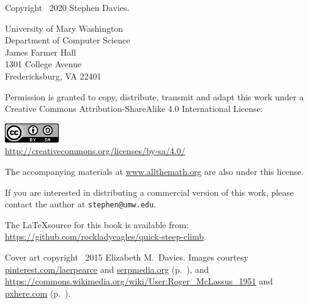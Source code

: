 
\thispagestyle{empty}

Copyright \textcopyright \ 2020 Stephen Davies.

\bigskip

University of Mary Washington\\
Department of Computer Science\\
James Farmer Hall\\
1301 College Avenue\\
Fredericksburg, VA  22401

\vspace{.4in}

Permission is granted to copy, distribute, transmit and adapt this work under a
Creative Commons Attribution-ShareAlike 4.0 International License:

\begin{center}
\includegraphics{cc_license.png}\\
\smallskip
\url{http://creativecommons.org/licenses/by-sa/4.0/}
\end{center}

The accompanying materials at \url{www.allthemath.org} are also under this
license.

\vspace{.2in}
If you are interested in distributing a commercial version of this work, please
contact the author at \texttt{stephen@umw.edu}.

\vspace{.4in}
The \LaTeX source for this book is available from:
\url{https://github.com/rockladyeagles/quick-steep-climb}.


\vspace{1in}
Cover art copyright \textcopyright \ 2015 Elizabeth M.~Davies.
Images courtesy \url{pinterest.com/laerpearce} and \url{serpmedia.org}
(p.~\pageref{tacoma}), and
\url{https://commons.wikimedia.org/wiki/User:Roger\_McLassus\_1951} and
\url{pxhere.com} (p.~\pageref{slinky}).
